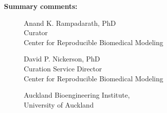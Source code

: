 \documentclass{article}
\begin{document}
\newpage
\bigskip
\noindent
\textbf{Summary comments:} 


\bigskip
\bigskip
\bigskip
\begin{figure}[ht]
\begin{minipage}[b]{0.45\linewidth}
\centering
Anand K. Rampadarath\footnotemark, PhD
\\
Curator
\\
Center for Reproducible Biomedical Modeling
\end{minipage}
\hspace{0.5cm}
\begin{minipage}[b]{0.45\linewidth}
\centering
David P. Nickerson, PhD
\\
Curation Service Director
\\
Center for Reproducible Biomedical Modeling
\end{minipage}
\end{figure}
\begin{figure}[ht]
\centering
Auckland Bioengineering Institute,
\\
University of Auckland
\end{figure}
\end{document}
